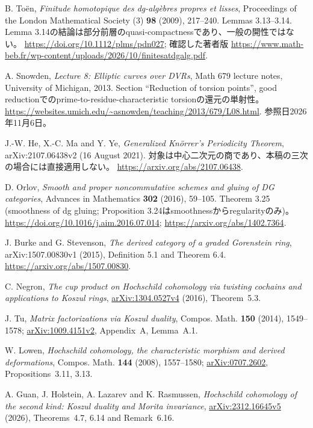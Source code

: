 B. Toën, \emph{Finitude homotopique des dg-algèbres propres et lisses},
Proceedings of the London Mathematical Society (3) \textbf{98} (2009), 217--240.
Lemmas 3.13--3.14. Lemma 3.14の結論は部分前層のquasi-compactnessであり、一般の開性ではない。
\url{https://doi.org/10.1112/plms/pdn027};
確認した著者版 \url{https://www.math-beb.fr/wp-content/uploads/2026/10/finitesatdgalg.pdf}.

A. Snowden, \emph{Lecture 8: Elliptic curves over DVRs},
Math 679 lecture notes, University of Michigan, 2013.
Section ``Reduction of torsion points'', good reductionでのprime-to-residue-characteristic torsionの還元の単射性。
\url{https://websites.umich.edu/~asnowden/teaching/2013/679/L08.html}.
参照日2026年11月6日。

J.-W. He, X.-C. Ma and Y. Ye, \emph{Generalized Kn\"orrer's Periodicity Theorem},
arXiv:2107.06438v2 (16 August 2021).
対象は中心二次元の商であり、本稿の三次の場合には直接適用しない。
\url{https://arxiv.org/abs/2107.06438}.

D. Orlov,
\emph{Smooth and proper noncommutative schemes and gluing of DG categories},
Advances in Mathematics \textbf{302} (2016), 59--105.
Theorem 3.25 (smoothness of dg gluing; Proposition 3.24はsmoothnessからregularityのみ)。
\url{https://doi.org/10.1016/j.aim.2016.07.014};
\url{https://arxiv.org/abs/1402.7364}.

J. Burke and G. Stevenson,
\emph{The derived category of a graded Gorenstein ring},
arXiv:1507.00830v1 (2015), Definition 5.1 and Theorem 6.4.
\url{https://arxiv.org/abs/1507.00830}.

C. Negron, \emph{The cup product on Hochschild cohomology via twisting cochains and applications to Koszul rings},
\href{https://arxiv.org/abs/1304.0527v4}{arXiv:1304.0527v4} (2016), Theorem~5.3.

J. Tu, \emph{Matrix factorizations via Koszul duality},
Compos. Math. \textbf{150} (2014), 1549--1578;
\href{https://arxiv.org/abs/1009.4151v2}{arXiv:1009.4151v2}, Appendix~A, Lemma~A.1.

W. Lowen, \emph{Hochschild cohomology, the characteristic morphism and derived deformations},
Compos. Math. \textbf{144} (2008), 1557--1580;
\href{https://arxiv.org/abs/0707.2602}{arXiv:0707.2602}, Propositions~3.11, 3.13.

A. Guan, J. Holstein, A. Lazarev and K. Rasmussen,
\emph{Hochschild cohomology of the second kind: Koszul duality and Morita invariance},
\href{https://arxiv.org/abs/2312.16645v5}{arXiv:2312.16645v5} (2026),
Theorems~4.7, 6.14 and Remark~6.16.

